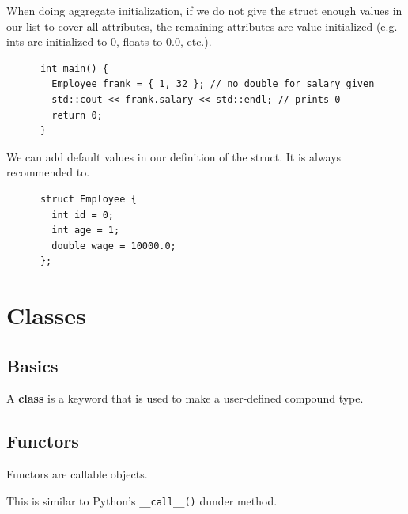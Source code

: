 \documentclass{article}
\newcounter{definition}[section]
\begin{document}
  \begin{lemma}
    \label{thm:missing-initialization-values}
    When doing aggregate initialization, if we do not give the struct enough values in our list to cover all attributes, the remaining attributes are value-initialized (e.g. ints are initialized to 0, floats to 0.0, etc.). 
    \begin{lstlisting}
      int main() {
        Employee frank = { 1, 32 }; // no double for salary given 
        std::cout << frank.salary << std::endl; // prints 0
        return 0; 
      }
    \end{lstlisting}
  \end{lemma}

  \begin{lemma}
    \label{thm:default-initialization-values}
    We can add default values in our definition of the struct. It is always recommended to. 
    \begin{lstlisting}
      struct Employee {
        int id = 0;
        int age = 1;
        double wage = 10000.0;
      };
    \end{lstlisting}
  \end{lemma}

\section{Classes} 

  \subsection{Basics} 

    \begin{definition}[Class]
      \label{def:class}
      A \textbf{class} is a keyword that is used to make a user-defined compound type. 
    \end{definition}

  \subsection{Functors} 

      \begin{definition}[Functors]
        \label{def:functors}
        Functors are callable objects. 
      \end{definition}

      This is similar to Python's \texttt{\_\_call\_\_()} dunder method. 
\end{document}
